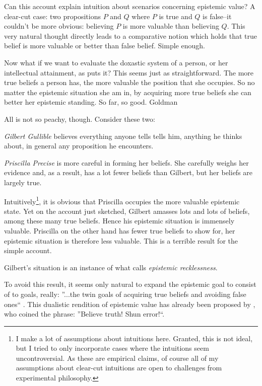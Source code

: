 \documentclass[12pt,numbers=noenddot]{scrartcl}
\begin{document}
Can this account explain intuition about scenarios concerning epistemic value?  A clear-cut case: two propositions $P$ and $Q$ where $P$ is true and $Q$ is false–it couldn't be more obvious: believing $P$ is more valuable than believing $Q$. This very natural thought directly leads to a comparative notion which holds that true belief is more valuable or better than false belief. Simple enough.

Now what if we want to evaluate the doxastic system of a person, or her intellectual attainment, as \textcite[58]{Goldman2002-GOLTUO-2} puts it? This seems just as straightforward. The more true beliefs a person has, the more valuable the position that she occupies. So no matter the epistemic situation she am in, by acquiring more true beliefs she can better her epistemic standing. So far, so good. Goldman\textcite[59]{Goldman2002-GOLTUO-2}

All is not so peachy, though. Consider these two:
\begin{description}
    \item \emph{Gilbert Gullible} believes everything anyone tells tells him, anything he thinks about, in general any proposition he encounters.
    \item \emph{Priscilla Precise} is more careful in forming her beliefs. She carefully weighs her evidence and, as a result, has a lot fewer beliefs than Gilbert, but her beliefs are largely true.
\end{description}

Intuitively\footnote{I make a lot of assumptions about intuitions here. Granted, this is not ideal, but I tried to only incorporate cases where the intuitions seem uncontroversial. As these are empirical claims, of course all of my assumptions about clear-cut intuitions are open to challenges from experimental philosophy.}, it is obvious that Priscilla occupies the more valuable epistemic state. Yet on the account just sketched, Gilbert amasses lots and lots of beliefs, among these many true beliefs. Hence his epistemic situation is immensely valuable. Priscilla on the other hand has fewer true beliefs to show for, her epistemic situation is therefore less valuable. This is a terrible result for the simple account.

Gilbert’s situation is an instance of what \textcite[360]{Berker2013-BERETA-2} calls \emph{epistemic recklessness}. 

To avoid this result, it seems only natural to expand the epistemic goal to consist of to goals, really: ”...the twin goals of acquiring true beliefs and avoiding false ones“ \textcite[339]{Berker2013-BERETA-2}. This dualistic rendition of epistemic value has already been proposed by \textcite[17]{James1896-JAMTWT-19}, who coined the phrase: ”Believe truth! Shun error!“.
\end{document}
